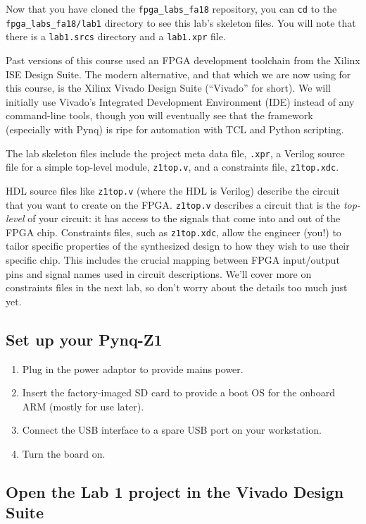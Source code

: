 \documentclass[11pt]{article}
\begin{document}
Now that you have cloned the \verb|fpga_labs_fa18| repository, you can \verb|cd| to the 
\verb|fpga_labs_fa18/lab1| directory to see this lab's skeleton files. You will note that there is a \verb|lab1.srcs| directory and a \verb|lab1.xpr| file.

Past versions of this course used an FPGA development toolchain from the Xilinx ISE Design Suite. The modern alternative, and that which we are now using for this course, is the Xilinx Vivado Design Suite (``Vivado'' for short). We will initially use Vivado's Integrated Development Environment (IDE) instead of any command-line tools, though you will eventually see that the framework (especially with Pynq) is ripe for automation with TCL and Python scripting.

The lab skeleton files include the project meta data file, \verb|.xpr|, a Verilog source file for a simple top-level module, \verb|z1top.v|, and a constraints file, \verb|z1top.xdc|.

HDL source files like \verb|z1top.v| (where the HDL is Verilog) describe the circuit that you want to create on the FPGA. \verb|z1top.v| describes a circuit that is the \emph{top-level} of your circuit: it has access to the signals that come into and out of the FPGA chip. Constraints files, such as \verb|z1top.xdc|, allow the engineer (you!) to tailor specific properties of the synthesized design to how they wish to use their specific chip. This includes the crucial mapping between FPGA input/output pins and signal names used in circuit descriptions. We'll cover more on constraints files in the next lab, so don't worry about the details too much just yet.

\subsection{Set up your Pynq-Z1}

\begin{enumerate}
  \item Plug in the power adaptor to provide mains power.
  \item Insert the factory-imaged SD card to provide a boot OS for the onboard ARM (mostly for use later).
  \item Connect the USB interface to a spare USB port on your workstation.
  \item Turn the board on.
\end{enumerate}

\subsection{Open the Lab 1 project in the Vivado Design Suite}
\end{document}
